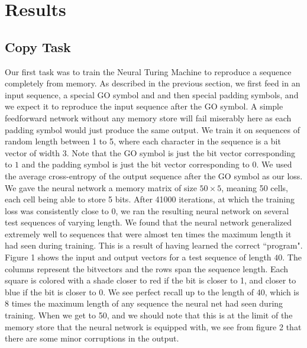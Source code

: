 \documentclass[12pt]{article}
\begin{document}
\section{Results}\label{results}

\subsection{Copy Task}

Our first task was to train the Neural Turing Machine to reproduce a sequence
completely from memory. As described in the previous section, we first feed in
an input sequence, a special GO symbol and and then special padding symbols,
and we expect it to reproduce the input sequence after the GO symbol.
A simple feedforward network without any memory store will fail miserably
here as each padding symbol would just produce the same output.
We train it on sequences of random length between 1 to 5, where each character
in the sequence is a bit vector of width 3. Note that the GO symbol is just the
bit vector corresponding to $1$ and the padding symbol is just the bit vector
corresponding to $0$. We used the average cross-entropy
of the output sequence after the GO symbol as our loss. We gave the neural
network a memory matrix of size $50 \times 5$, meaning 50 cells, each cell being
able to store 5 bits. After 41000 iterations, at which the training loss was
consistently close to 0, we ran the resulting neural network on several test
sequences of varying length. We found that the neural network generalized
extremely well to sequences that were almost ten times the maximum length
it had seen during training. This is a result of having learned the correct
``program". Figure 1 shows the input and output vectors for a test sequence
of length $40$. The columns represent the bitvectors and the rows span
the sequence length. Each square is colored with a shade closer to red if the
bit is closer to 1, and closer to blue if the bit is closer to 0.
We see perfect recall up to the length of 40, which is 8 times the maximum
length of any sequence the neural net had seen during training.
When we get to 50, and we should
note that this is at the limit of the memory store that the neural network
is equipped with, we see from figure 2 that there are some minor corruptions
in the output.
\end{document}
